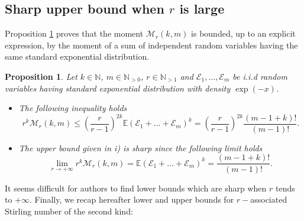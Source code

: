 \documentclass{article}
\theoremstyle{plain}
\newtheorem{proposition}[theorem]{Proposition}
\newcommand{\N}{{\mathbb N}}
\newcommand{\E}{{\mathbb E}}
\newcommand{\V}{{\mathcal M}}
\begin{document}
\subsection{Sharp upper bound when $r$ is large}
Proposition \ref{prop:bounds_expo} proves that the moment $\V_r(k,m)$
is bounded, up to an explicit expression, by the moment of a sum of independent random variables having the same standard exponential distribution.
\begin{proposition}
\label{prop:bounds_expo}
Let $k \in \N$, $m\in \N_{>0}$, $r\in \N_{>1}$ and $\mathcal{E}_1,\dots,\mathcal{E}_m$ be i.i.d random variables having standard exponential distribution with density $\exp(-x)$.
\begin{itemize}
    \item[i)] The following inequality holds
    \begin{equation}
    r^k\V_r(k,m)\le \left(\frac{r}{r-1}\right)^{2k} \E\left(\mathcal{E}_1+\dots+\mathcal{E}_m\right)^k =\left(\frac{r}{r-1}\right)^{2k} \frac{(m-1+k)!}{(m-1)!}.
    \end{equation}
    \item[ii)] The upper bound given in i) is sharp since the following limit holds 
    \begin{equation}
    \lim_{r\to +\infty} r^{k}\V_r(k,m)=\E\left(\mathcal{E}_1+\dots+\mathcal{E}_m\right)^k= \frac{(m-1+k)!}{(m-1)!}.
    \end{equation}
\end{itemize}
\end{proposition}
It seems difficult for authors to find lower bounds which are sharp when $r$ tends to $+\infty$. Finally, we recap hereafter lower and upper bounds for $r-$associated Stirling number of the second kind:
\end{document}
